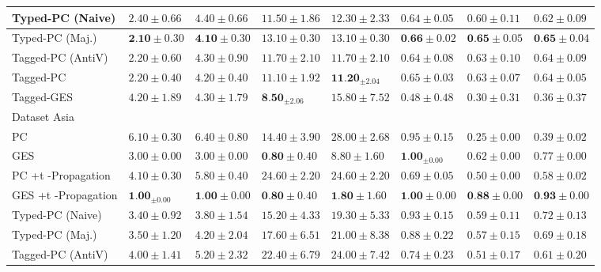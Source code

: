 \documentclass[10pt]{article}
\begin{document}
\begin{center}
\begin{tabular}{|l|l|l|l|l|l|l|l|}
\hline
Typed-PC (Naive) & $2.40 \pm 0.66$ & $4.40 \pm 0.66$ & $11.50 \pm 1.86$ & $12.30 \pm 2.33$ & $0.64 \pm 0.05$ & $0.60 \pm 0.11$ & $0.62 \pm 0.09$ \\
\hline
Typed-PC (Maj.) & $\mathbf{2 . 1 0} \pm 0.30$ & $\mathbf{4 . 1 0} \pm 0.30$ & $13.10 \pm 0.30$ & $13.10 \pm 0.30$ & $\mathbf{0 . 6 6} \pm 0.02$ & $\mathbf{0 . 6 5} \pm 0.05$ & $\mathbf{0 . 6 5} \pm 0.04$ \\
\hline
Tagged-PC (AntiV) & $2.20 \pm 0.60$ & $4.30 \pm 0.90$ & $11.70 \pm 2.10$ & $11.70 \pm 2.10$ & $0.64 \pm 0.08$ & $0.63 \pm 0.10$ & $0.64 \pm 0.09$ \\
\hline
Tagged-PC & $2.20 \pm 0.40$ & $4.20 \pm 0.40$ & $11.10 \pm 1.92$ & $\mathbf{1 1 . 2 0}_{ \pm 2.04}$ & $0.65 \pm 0.03$ & $0.63 \pm 0.07$ & $0.64 \pm 0.05$ \\
\hline
Tagged-GES & $4.20 \pm 1.89$ & $4.30 \pm 1.79$ & $\mathbf{8 . 5 0}_{ \pm 2.06}$ & $15.80 \pm 7.52$ & $0.48 \pm 0.48$ & $0.30 \pm 0.31$ & $0.36 \pm 0.37$ \\
\hline
Dataset Asia & \multicolumn{7}{|c|}{} \\
\hline
PC & $6.10 \pm 0.30$ & $6.40 \pm 0.80$ & $14.40 \pm 3.90$ & $28.00 \pm 2.68$ & $0.95 \pm 0.15$ & $0.25 \pm 0.00$ & $0.39 \pm 0.02$ \\
\hline
GES & $3.00 \pm 0.00$ & $3.00 \pm 0.00$ & $\mathbf{0 . 8 0} \pm 0.40$ & $8.80 \pm 1.60$ & $\mathbf{1 . 0 0}_{ \pm 0.00}$ & $0.62 \pm 0.00$ & $0.77 \pm 0.00$ \\
\hline
PC +t -Propagation & $4.10 \pm 0.30$ & $5.80 \pm 0.40$ & $24.60 \pm 2.20$ & $24.60 \pm 2.20$ & $0.69 \pm 0.05$ & $0.50 \pm 0.00$ & $0.58 \pm 0.02$ \\
\hline
GES +t -Propagation & $\mathbf{1 . 0 0}_{ \pm 0.00}$ & $\mathbf{1 . 0 0} \pm 0.00$ & $\mathbf{0 . 8 0} \pm 0.40$ & $\mathbf{1 . 8 0} \pm 1.60$ & $\mathbf{1 . 0 0} \pm 0.00$ & $\mathbf{0 . 8 8} \pm 0.00$ & $\mathbf{0 . 9 3} \pm 0.00$ \\
\hline
Typed-PC (Naive) & $3.40 \pm 0.92$ & $3.80 \pm 1.54$ & $15.20 \pm 4.33$ & $19.30 \pm 5.33$ & $0.93 \pm 0.15$ & $0.59 \pm 0.11$ & $0.72 \pm 0.13$ \\
\hline
Typed-PC (Maj.) & $3.50 \pm 1.20$ & $4.20 \pm 2.04$ & $17.60 \pm 6.51$ & $21.00 \pm 8.38$ & $0.88 \pm 0.22$ & $0.57 \pm 0.15$ & $0.69 \pm 0.18$ \\
\hline
Tagged-PC (AntiV) & $4.00 \pm 1.41$ & $5.20 \pm 2.32$ & $22.40 \pm 6.79$ & $24.00 \pm 7.42$ & $0.74 \pm 0.23$ & $0.51 \pm 0.17$ & $0.61 \pm 0.20$ \\
\hline

\end{tabular}
\end{center}
\end{document}

